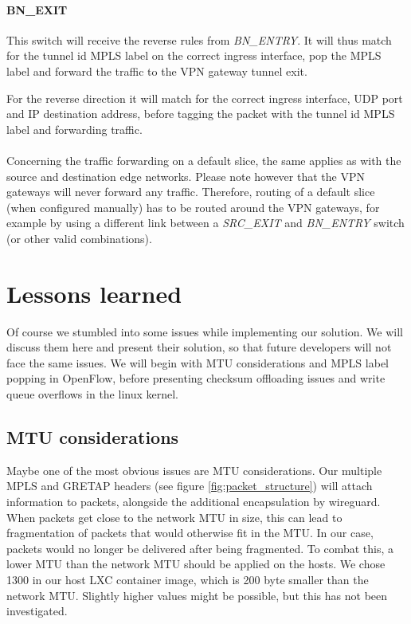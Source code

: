 \paragraph{BN\_EXIT} This switch will receive the reverse rules from \textit{BN\_ENTRY}. It will thus match for the tunnel id MPLS label on the correct ingress interface, pop the MPLS label and forward the traffic to the VPN gateway tunnel exit.

For the reverse direction it will match for the correct ingress interface, UDP port and IP destination address, before tagging the packet with the tunnel id MPLS label and forwarding traffic.

\paragraph{} Concerning the traffic forwarding on a default slice, the same applies as with the source and destination edge networks. Please note however that the VPN gateways will never forward any traffic. Therefore, routing of a default slice (when configured manually) has to be routed around the VPN gateways, for example by using a different link between a \textit{SRC\_EXIT} and \textit{BN\_ENTRY} switch (or other valid combinations).

\section{Lessons learned}
Of course we stumbled into some issues while implementing our solution. We will discuss them here and present their solution, so that future developers will not face the same issues. We will begin with MTU considerations and MPLS label popping in OpenFlow, before presenting checksum offloading issues and write queue overflows in the linux kernel. 

\subsection{MTU considerations}
Maybe one of the most obvious issues are MTU considerations. Our multiple MPLS and GRETAP headers (see figure \ref{fig:packet_structure}) will attach information to packets, alongside the additional encapsulation by wireguard. When packets get close to the network MTU in size, this can lead to fragmentation of packets that would otherwise fit in the MTU. In our case, packets would no longer be delivered after being fragmented. To combat this, a lower MTU than the network MTU should be applied on the hosts. We chose 1300 in our host LXC container image, which is 200 byte smaller than the network MTU. Slightly higher values might be possible, but this has not been investigated.

